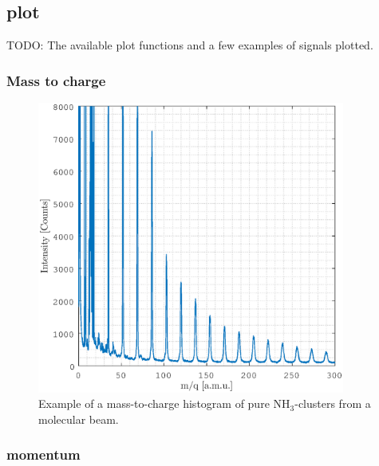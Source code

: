 \newpage
\subsection{plot}
TODO: The available plot functions and a few examples of signals plotted.

\subsubsection{Mass to charge}

\begin{figure}[h]
   \centering
    \centerline{\includegraphics[width=0.9\textwidth]{Graphics/m2q_hist_example.eps}}
\caption{Example of a mass-to-charge histogram of pure NH$_3$-clusters from a molecular beam.}
\end{figure}

\subsubsection{momentum}

